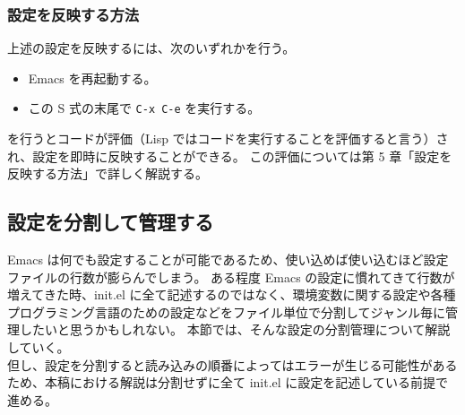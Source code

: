 \subsubsection{設定を反映する方法}
上述の設定を反映するには、次のいずれかを行う。
\begin{itemize}\setlength{\leftskip}{-0.00zw}%
\item[\ajMaru{1}] Emacs を再起動する。
\item[\ajMaru{2}] この S 式の末尾で \texttt{C-x C-e} を実行する。
\end{itemize}
 を行うとコードが評価（Lisp ではコードを実行することを評価すると言う）され、設定を即時に反映することができる。
この評価については第 5 章「設定を反映する方法」で詳しく解説する。
\subsection{設定を分割して管理する}
Emacs は何でも設定することが可能であるため、使い込めば使い込むほど設定ファイルの行数が膨らんでしまう。
ある程度 Emacs の設定に慣れてきて行数が増えてきた時、init.el に全て記述するのではなく、環境変数に関する設定や各種プログラミング言語のための設定などをファイル単位で分割してジャンル毎に管理したいと思うかもしれない。
本節では、そんな設定の分割管理について解説していく。\\

但し、設定を分割すると読み込みの順番によってはエラーが生じる可能性があるため、本稿における解説は分割せずに全て init.el に設定を記述している前提で進める。
